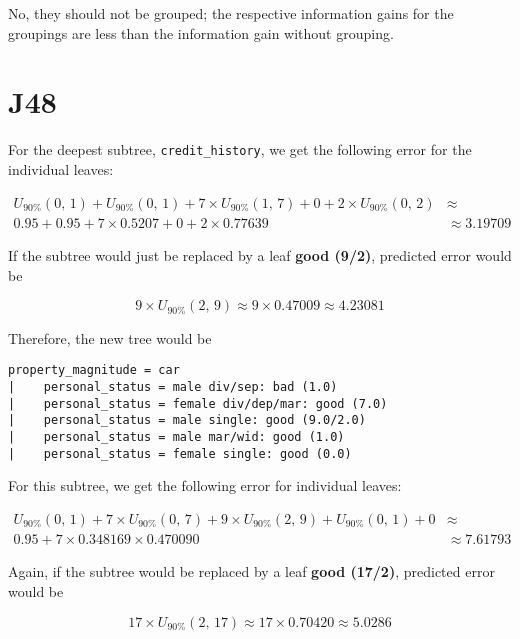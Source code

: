 \documentclass[12pt]{scrartcl}
\begin{document}
No, they should not be grouped; the respective information gains for the groupings are less than the information gain without grouping.

\section{J48}
For the deepest subtree, \texttt{credit\_history}, we get the following error for the individual leaves:

\begin{align*}
    U_{90\%}(0,\, 1) +
    U_{90\%}(0,\, 1) +
    7\times U_{90\%}(1,\, 7) +
    0 +
    2\times U_{90\%}(0,\, 2) &\approx\\
    0.95 +
    0.95 +
    7\times 0.5207 +
    0 +
    2\times 0.77639 &\approx 3.19709
\end{align*}

If the subtree would just be replaced by a leaf \textbf{good (9/2)}, predicted error would be

\begin{equation*}
    9\times U_{90\%}(2,\, 9) \approx 9\times 0.47009 \approx 4.23081
\end{equation*}

Therefore, the new tree would be

\begin{verbatim}
property_magnitude = car
|    personal_status = male div/sep: bad (1.0)
|    personal_status = female div/dep/mar: good (7.0)
|    personal_status = male single: good (9.0/2.0)
|    personal_status = male mar/wid: good (1.0)
|    personal_status = female single: good (0.0)
\end{verbatim}

For this subtree, we get the following error for individual leaves:

\begin{align*}
    U_{90\%}(0,\, 1) +
    7 \times U_{90\%}(0,\, 7) +
    9\times U_{90\%}(2,\, 9) +
    U_{90\%}(0,\, 1) +
    0 &\approx \\
    0.95 +
    7\times 0.34816
    9\times 0.47009
    0 &\approx 7.61793
\end{align*}

Again, if the subtree would be replaced by a leaf \textbf{good (17/2)}, predicted error would be

\begin{equation*}
    17\times U_{90\%}(2,\, 17) \approx 17\times 0.70420 \approx 5.0286
\end{equation*}
\end{document}
